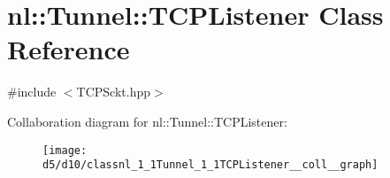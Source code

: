 \hypertarget{classnl_1_1Tunnel_1_1TCPListener}{}\section{nl\+:\+:Tunnel\+:\+:T\+C\+P\+Listener Class Reference}
\label{classnl_1_1Tunnel_1_1TCPListener}


{\ttfamily \#include $<$T\+C\+P\+Sckt.\+hpp$>$}



Collaboration diagram for nl\+:\+:Tunnel\+:\+:T\+C\+P\+Listener\+:
\nopagebreak
\begin{figure}[H]
\begin{center}
\leavevmode
\texttt{[image: d5/d10/classnl\_1\_1Tunnel\_1\_1TCPListener\_\_coll\_\_graph]}
\end{center}
\end{figure}
